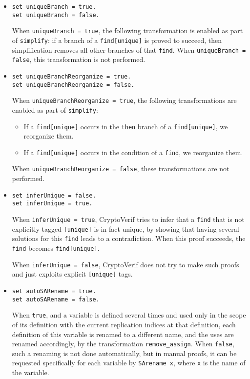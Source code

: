 \begin{itemize}
\begin{itemize}
\item \texttt{set uniqueBranch = true.}\\
\texttt{set uniqueBranch = false.}

When {\tt uniqueBranch = true}, the following transformation is 
enabled as part of {\tt simplify}:
if a branch of a {\tt find[unique]} is proved to succeed, 
then simplification removes all other branches of that {\tt find}.
When {\tt uniqueBranch = false}, this transformation is not performed. 

\item \texttt{set uniqueBranchReorganize = true.}\\
\texttt{set uniqueBranchReorganize = false.}

When {\tt uniqueBranchReorganize = true}, the following transformations are 
enabled as part of {\tt simplify}:
\begin{itemize}
\item
If a {\tt find[unique]} occurs in the {\tt then} branch 
of a {\tt find[unique]}, we reorganize them.

\item 
If a {\tt find[unique]} occurs in the condition of a {\tt find}, 
we reorganize them.

\end{itemize}
When {\tt uniqueBranchReorganize = false}, these transformations are not performed. 

\item \texttt{set inferUnique = false.}\\
\texttt{set inferUnique = true.}

When \texttt{inferUnique = true}, CryptoVerif tries to infer
that a \texttt{find} that is not explicitly tagged \texttt{[unique]}
is in fact unique, by showing that having several solutions
for this \texttt{find} leads to a contradiction.
When this proof succeeds, the \texttt{find} becomes {\tt find[unique]}.

When \texttt{inferUnique = false}, CryptoVerif does not try to
make such proofs and just exploits explicit \texttt{[unique]} tags.

\item \texttt{set autoSARename = true.}\\
\texttt{set autoSARename = false.}

When {\tt true}, and a variable is defined several times and
used only in the scope of its definition with the current
replication indices at that definition, each definition of
this variable is renamed to a different name, and the uses
are renamed accordingly, by the transformation {\tt remove\string_assign}.
When {\tt false}, such a renaming is not done automatically,
but in manual proofs, it can be requested specifically for each 
variable by {\tt SArename x}, where {\tt x} is the name of the variable.


\end{itemize}
\end{itemize}
